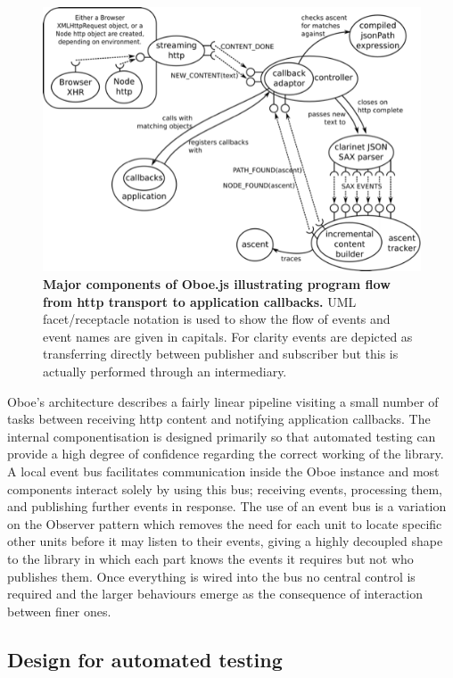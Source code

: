 \documentclass[]{article}
\makeatletter
\def\maxwidth{\ifdim\Gin@nat@width>\linewidth\linewidth
\else\Gin@nat@width\fi}
\let\Oldincludegraphics\includegraphics
\renewcommand{\includegraphics}[1]{\Oldincludegraphics[width=\maxwidth]{#1}}
\makeatother
\begin{document}
\begin{figure}[htbp]
\centering
\includegraphics{images/overallDesign.png}
\caption{\textbf{Major components of Oboe.js illustrating program flow
from http transport to application callbacks.} UML facet/receptacle
notation is used to show the flow of events and event names are given in
capitals. For clarity events are depicted as transferring directly
between publisher and subscriber but this is actually performed through
an intermediary. \label{overallDesign}}
\end{figure}

Oboe's architecture describes a fairly linear pipeline visiting a small
number of tasks between receiving http content and notifying application
callbacks. The internal componentisation is designed primarily so that
automated testing can provide a high degree of confidence regarding the
correct working of the library. A local event bus facilitates
communication inside the Oboe instance and most components interact
solely by using this bus; receiving events, processing them, and
publishing further events in response. The use of an event bus is a
variation on the Observer pattern which removes the need for each unit
to locate specific other units before it may listen to their events,
giving a highly decoupled shape to the library in which each part knows
the events it requires but not who publishes them. Once everything is
wired into the bus no central control is required and the larger
behaviours emerge as the consequence of interaction between finer ones.

\subsection{Design for automated testing}
\end{document}
